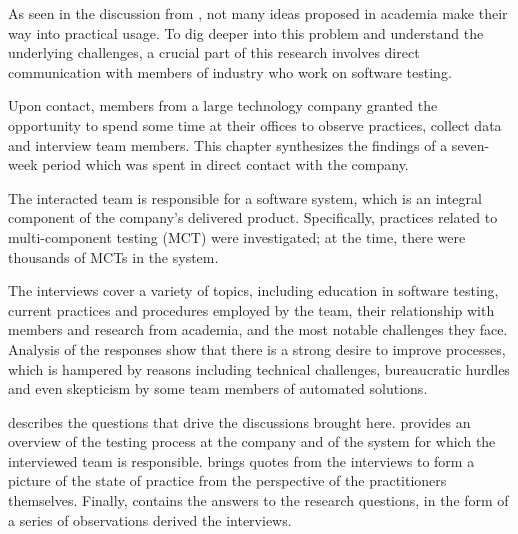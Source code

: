 
As seen in the discussion from , not many ideas proposed in academia make their way into practical usage.
To dig deeper into this problem and understand the underlying challenges, a crucial part of this research involves direct communication with members of industry who work on software testing.

Upon contact, members from a large technology company granted the opportunity to spend some time at their offices to observe practices, collect data and interview team members.
This chapter synthesizes the findings of a seven-week period which was spent in direct contact with the company.

The interacted team is responsible for a software system, which is an integral component of the company's delivered product.
Specifically, practices related to multi-component testing (MCT) were investigated; at the time, there were thousands of MCTs in the system.

The interviews cover a variety of topics, including education in software testing, current practices and procedures employed by the team, their relationship with members and research from academia, and the most notable challenges they face.
Analysis of the responses show that there is a strong desire to improve processes, which is hampered by reasons including technical challenges, bureaucratic hurdles and even skepticism by some team members of automated solutions.

 describes the questions that drive the discussions brought here.
 provides an overview of the testing process at the company and of the system for which the interviewed team is responsible.
 brings quotes from the interviews to form a picture of the state of practice from the perspective of the practitioners themselves.
Finally,  contains the answers to the research questions, in the form of a series of observations derived the interviews.



